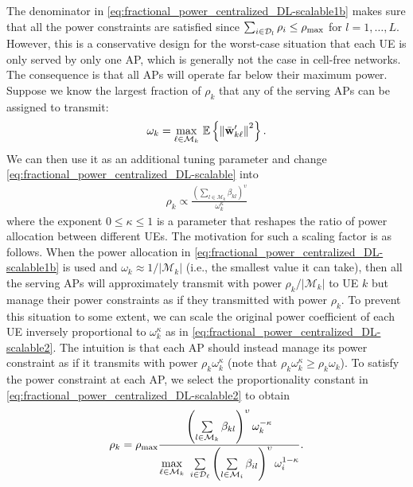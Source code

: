The denominator in \eqref{eq:fractional_power_centralized_DL-scalable1b} makes sure that all the power constraints are satisfied since
$\sum_{i \in \mathcal{D}_l} \rho_i \leq \rho_{\textrm{max}}$ for $l=1,\ldots,L$.
However, this is a conservative design for the worst-case situation that each UE is only served by only one AP, which is generally not the case in cell-free networks. The consequence is that all APs will operate far below their maximum power.
Suppose we know the largest fraction of $\rho_k$ that any of the serving APs can be assigned to transmit:
\begin{align}
\omega_k = \underset{\ell\in\mathcal{M}_k}{\max} \ \mathbb{E} \left\{ \left\| \bar{\mathbf{w}}_{k\ell}^{\prime} \right\|^2 \right\}.
\end{align} 
We can then use it as an additional tuning parameter and change \eqref{eq:fractional_power_centralized_DL-scalable} into
\begin{align}\label{eq:fractional_power_centralized_DL-scalable2}
\rho_k\propto \frac{\left(\sum\limits_{l\in\mathcal{M}_k}\beta_{kl}\right)^{\upsilon}}{\omega_k^{\kappa}}
\end{align}
where the exponent $0\leq\kappa\leq1$ is a parameter that reshapes the ratio of power allocation between different UEs. The motivation for such a scaling factor is as follows. When the power allocation in \eqref{eq:fractional_power_centralized_DL-scalable1b} is used and $\omega_k \approx 1/| \mathcal{M}_k |$ (i.e., the smallest value it can take), then all the serving APs will approximately transmit with power $\rho_k /| \mathcal{M}_k |$ to UE $k$ but manage their power constraints as if they transmitted with power $\rho_k$.
To prevent this situation to some extent, we can scale the original power coefficient of each UE inversely proportional to $\omega_k^{\kappa}$ as in \eqref{eq:fractional_power_centralized_DL-scalable2}. The intuition is that each AP should instead 
manage its power constraint as if it transmits with power $\rho_k \omega_k^\kappa$ (note that $\rho_k \omega_k^\kappa \geq \rho_k \omega_k$).
To satisfy the power constraint at each AP, we select the proportionality constant in \eqref{eq:fractional_power_centralized_DL-scalable2} to obtain
\begin{align}\label{eq:fractional_power_centralized_DL-scalable3}
\rho_k=\rho_{\textrm{max}} \frac{\left(\sum\limits_{l\in\mathcal{M}_k}\beta_{kl}\right)^{\upsilon}\omega_k^{-\kappa}}{\underset{\ell\in \mathcal{M}_k}{\max} \  \sum\limits_{i\in \mathcal{D}_{\ell}}   \left(\sum\limits_{l\in\mathcal{M}_i}\beta_{il}\right)^{\upsilon}\omega_i^{1-\kappa}}.
\end{align}

